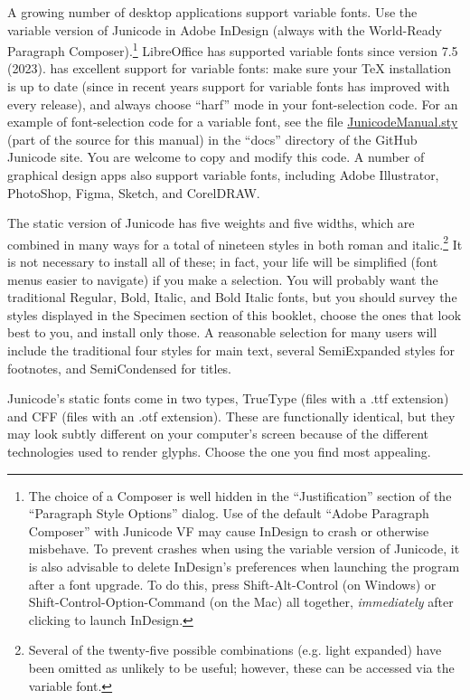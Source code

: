A growing number of desktop applications support variable fonts. Use the variable version of
Junicode in Adobe InDesign (always with the World-Ready Paragraph Composer).\footnote{%
The choice of a Composer is well hidden in the “Justification” section of the
“Paragraph Style Options” dialog. Use of the default “Adobe Paragraph Composer”
with Junicode VF may cause InDesign to crash or otherwise misbehave. To prevent crashes
when using the variable version of Junicode,
it is also advisable to delete InDesign's preferences when launching the program after
a font upgrade. To do this, press Shift-Alt-Control (on Windows) or
Shift-Control-Option-Command (on the Mac) all together, \textit{immediately} after
clicking to launch InDesign.} LibreOffice
has supported variable fonts since version 7.5 (2023). {\LuaTeX} has excellent support
for variable fonts: make sure your TeX installation is up to date (since in
recent years support for variable fonts has improved with every release), and always choose “harf”
mode in your font-selection code. For an example of font-selection code for a
variable font, see the file
\href{https://github.com/psb1558/Junicode-font/blob/master/docs/JunicodeManual.sty}%
{JunicodeManual.sty} (part of the source for this manual) in the “docs” directory of the GitHub Junicode site.
You are welcome to copy and modify this code. A number of graphical design apps 
also support variable fonts, including Adobe Illustrator, PhotoShop, Figma,
Sketch, and CorelDRAW.

The static version of Junicode has five weights and five widths, which are combined in many ways
for a total of nineteen styles in
both roman and italic.\footnote{Several of the twenty-five possible combinations
(e.g. {\lightexp light expanded})
have been omitted as unlikely to be useful; however, these can be accessed via the variable font.}
It is not necessary to install all of these; in fact,
your life will be simplified (font menus easier to navigate) if you
make a selection. You will probably want the traditional Regular, Bold, Italic, and Bold
Italic fonts, but you should survey the styles displayed in the Specimen
section of this booklet, choose the ones that look best to you, and install
only those. A reasonable selection for many users will include the traditional four
styles for main text, several SemiExpanded styles for footnotes, and
SemiCondensed for titles.

Junicode’s static fonts come in two types, TrueType (files with a .ttf extension) and
CFF (files with an .otf extension). These are functionally identical, but they may look
subtly different on your computer’s screen because of the different technologies used to
render glyphs. Choose the one you find most appealing.

